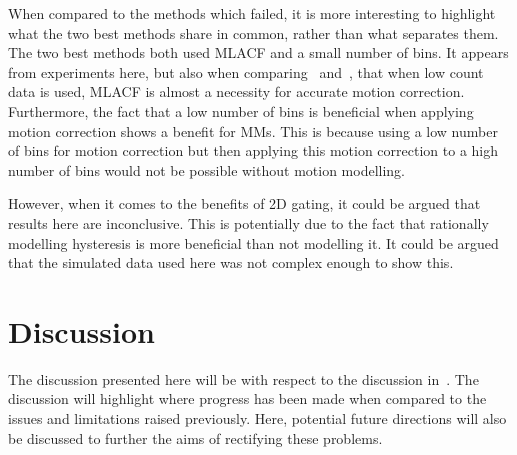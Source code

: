             When compared to the methods which failed, it is more interesting to highlight what the two best methods share in common, rather than what separates them. The two best methods both used \gls{MLACF} and a small number of bins. It appears from experiments here, but also when comparing~ and~, that when low count data is used, \gls{MLACF} is almost a necessity for accurate motion correction. Furthermore, the fact that a low number of bins is beneficial when applying motion correction shows a benefit for \glspl{MM}. This is because using a low number of bins for motion correction but then applying this motion correction to a high number of bins would not be possible without motion modelling.
            
            However, when it comes to the benefits of \gls{2D} gating, it could be argued that results here are inconclusive. This is potentially due to the fact that rationally modelling hysteresis is more beneficial than not modelling it. It could be argued that the simulated data used here was not complex enough to show this.
        
    \section{Discussion} \label{sec:subsequent_motion_correction_using_advanced_reconstruction_and_gating_methods_with_more_challenging_data_discussion}
        The discussion presented here will be with respect to the discussion in~. The discussion will highlight where progress has been made when compared to the issues and limitations raised previously. Here, potential future directions will also be discussed to further the aims of rectifying these problems.


